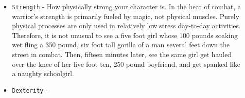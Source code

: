 \documentclass{report}
\begin{document}
\begin{itemize}
\begin{itemize}
\begin{itemize}
            \begin{itemize}
                \item \verb|Strength| - How physically strong your character is. In the heat of combat, a warrior's strength is primarily fueled by magic, not physical muscles. Purely 
                    physical
                    processes are only used in relatively low stress day-to-day activities. Therefore, it is not unusual to see a five foot girl whose 100 pounds soaking wet fling a 350 pound, six foot 
                    tall gorilla of a man several feet down the street in combat. Then, fifteen minutes later, see the same girl get hauled over the knee of her five foot ten, 250 pound boyfriend, and
                    get spanked like a naughty schoolgirl.
                \item \verb|Dexterity| - 
                    
                    


\end{itemize}
\end{itemize}
\end{itemize}
\end{itemize}
\end{document}
